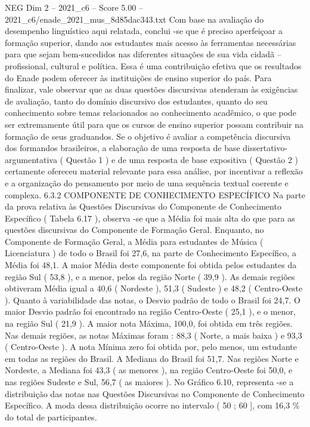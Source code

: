\begin{textsample}{NEG Dim 2 – 2021\_c6 – Score 5.00 – 2021\_c6/enade\_2021\_mus\_8d85dac343.txt}
Com base na avaliação do desempenho linguístico aqui relatada, conclui -se que é preciso aperfeiçoar a formação superior, dando aos estudantes mais acesso às ferramentas necessárias para que sejam bem-sucedidos nas diferentes situações de sua vida cidadã – profissional, cultural e política.
Essa é uma contribuição efetiva que os resultados do Enade podem oferecer às instituições de ensino superior do país.
Para finalizar, vale observar que as duas questões discursivas atenderam às exigências de avaliação, tanto do domínio discursivo dos estudantes, quanto do seu conhecimento sobre temas relacionados ao conhecimento acadêmico, o que pode ser extremamente útil para que os cursos de ensino superior possam contribuir na formação de seus graduandos.
Se o objetivo é avaliar a competência discursiva dos formandos brasileiros, a elaboração de uma resposta de base dissertativo-argumentativa ( Questão 1 ) e de uma resposta de base expositiva ( Questão 2 ) certamente ofereceu material relevante para essa análise, por incentivar a reflexão e a organização do pensamento por meio de uma sequência textual coerente e complexa. 6.3.2 COMPONENTE DE CONHECIMENTO ESPECÍFICO Na parte da prova relativa às Questões Discursivas do Componente de Conhecimento Específico ( Tabela 6.17 ), observa -se que a Média foi mais alta do que para as questões discursivas do Componente de Formação Geral.
Enquanto, no Componente de Formação Geral, a Média para estudantes de Música ( Licenciatura ) de todo o Brasil foi 27,6, na parte de Conhecimento Específico, a Média foi 48,1.
A maior Média deste componente foi obtida pelos estudantes da região Sul ( 53,8 ), e a menor, pelos da região Norte ( 39,9 ).
As demais regiões obtiveram Média igual a 40,6 ( Nordeste ), 51,3 ( Sudeste ) e 48,2 ( Centro-Oeste ).
Quanto à variabilidade das notas, o Desvio padrão de todo o Brasil foi 24,7.
O maior Desvio padrão foi encontrado na região Centro-Oeste ( 25,1 ), e o menor, na região Sul ( 21,9 ).
A maior nota Máxima, 100,0, foi obtida em três regiões.
Nas demais regiões, as notas Máximas foram : 88,3 ( Norte, a mais baixa ) e 93,3 ( Centro-Oeste ).
A nota Mínima zero foi obtida por, pelo menos, um estudante em todas as regiões do Brasil.
A Mediana do Brasil foi 51,7.
Nas regiões Norte e Nordeste, a Mediana foi 43,3 ( as menores ), na região Centro-Oeste foi 50,0, e nas regiões Sudeste e Sul, 56,7 ( as maiores ).
No Gráfico 6.10, representa -se a distribuição das notas nas Questões Discursivas no Componente de Conhecimento Específico.
A moda dessa distribuição ocorre no intervalo ( 50 ; 60 ], com 16,3 \% do total de participantes.

\end{textsample}
